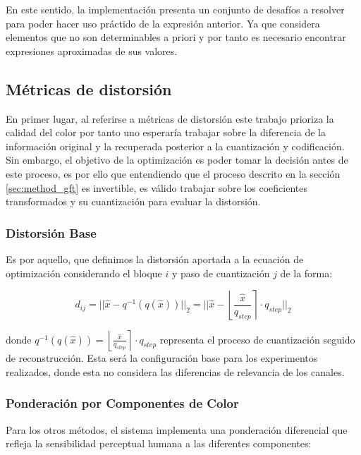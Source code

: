    En este sentido, la implementación presenta un conjunto de desafíos a resolver para poder hacer uso práctido de la expresión anterior. Ya que considera elementos que no son determinables a priori y por tanto es necesario encontrar expresiones aproximadas de sus valores.

    \subsection{Métricas de distorsión}
    
    En primer lugar, al referirse a métricas de distorsión este trabajo prioriza la calidad del color por tanto uno esperaría trabajar sobre la diferencia de la información original y la recuperada posterior a la cuantización y codificación. Sin embargo, el objetivo de la optimización es poder tomar la decisión antes de este proceso, es por ello que entendiendo que el proceso descrito en la sección \ref{sec:method_gft} es invertible, es válido trabajar sobre los coeficientes transformados y su cuantización para evaluar la distorsión.
    
    \subsubsection{Distorsión Base}
    
    Es por aquello, que definimos la distorsión aportada a la ecuación de optimización considerando el bloque $i$ y paso de cuantización $j$ de la forma:
    
    \begin{equation}
        d_{ij} = ||\hat{x} - q^{-1}(q(\hat{x}))||_2 = ||\hat{x} - \left\lfloor \frac{\hat{x}}{q_{step}} \right\rceil \cdot q_{step}||_2 
    \end{equation}
    
    donde $q^{-1}(q(\hat{x})) = \left\lfloor \frac{\hat{x}}{q_{step}} \right\rceil \cdot q_{step}$ representa el proceso de cuantización seguido de reconstrucción. Esta será la configuración base para los experimentos realizados, donde esta no considera las diferencias de relevancia de los canales.
    
    \subsubsection{Ponderación por Componentes de Color}
    
    Para los otros métodos, el sistema implementa una ponderación diferencial que refleja la sensibilidad perceptual humana a las diferentes componentes:
    
